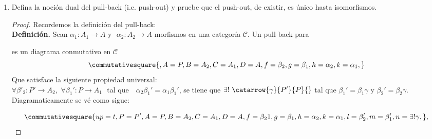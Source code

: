 \documentclass{article}
\begin{document}
\begin{enumerate}[label=\textbf{Ej \arabic*.}]
\begin{proof}
Así el siguiente diagrama conmmuta:
\begin{equation*}
\commutativesquare{,A=K,B=B',C=A,D=B, f=\alpha_2k_1,g=k_2,h=\theta_1,k=f,}
\end{equation*}	
Pero $P$ es un pull-back, por lo tanto existe un único $\eta\colon K\longrightarrow P$ tal que $\beta_1\eta=k_2$ y $g\eta=\alpha_2k_1$, 
entonces $\alpha_2\alpha_1\eta=\alpha_2k_1$ y dado que $\gamma_2$ es mono y $Q$ pull-back,
se tiene que $\alpha_2$ es mono y $\alpha_1\eta=k_1$.\\
Además, si $\gamma\colon K\longrightarrow P$ es tal que $\beta_1\gamma=k_2$\,\,y\,\,$g\gamma=\alpha_2k_1$, entonces \\
$\beta_1\gamma=\beta_1\eta$ y puesto que $\theta_1$ es mono y $P$ pullback, entonces $\beta_1$ es mono y $\gamma=\eta$. 
Por lo tanto $\eta$ es único hasta isomorfismos y en consecuencia $P$ es pull-back de
.
\end{proof}

\item Defina la noción dual del pull-back (i.e. push-out) y pruebe que el push-out, de existir, es único hasta isomorfismos.\\
\begin{proof}

Recordemos la definición del pull-back:\\
\textbf{Definición.} Sean $\alpha_1\colon A_1\longrightarrow A$\,\,y\,\, $\alpha_2\colon A_2\longrightarrow A$ morfismos en una categoría 
$\mathscr{C}$. Un pull-back para   es un diagrama conmutativo
en $\mathscr{C}$ 
 \begin{equation*}
\commutativesquare{,A=P,B=A_2,C=A_1,D=A, f=\beta_2,g=\beta_1,h=\alpha_2,k=\alpha_1,}
\end{equation*}	
Que satisface la siguiente propiedad universal:\\
$\forall \beta'_2\colon P'\longrightarrow A_2,\,\,\forall \beta_1'\colon P\longrightarrow A_1$\,\, tal que \,\, $\alpha_2\beta_1'=\alpha_1\beta_1'$, 
se tiene que $\exists !\ \catarrow{\gamma}{P'}{P}{}$ tal que $\beta_1'=\beta_1\gamma$ y $\beta_2'=\beta_2\gamma$. Diagramaticamente se 
vé como sigue:

\begin{equation*}
\commutativesquare{up=t,P=P',A=P,B=A_2,C=A_1,D=A,f=\beta_21,g=\beta_1,h=\alpha_2,k=\alpha_1,l=\beta_2',m=\beta_1',n=\exists !\gamma,},
\end{equation*}


\end{proof}
\end{enumerate}
\end{document}
